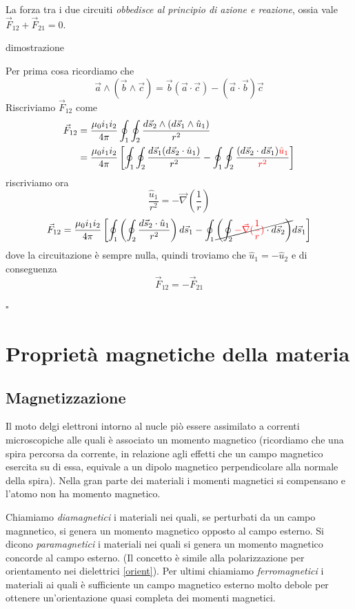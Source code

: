 \documentclass[x11names]{report}
\newcommand*{\QEDB}{\null\nobreak\hfill\ensuremath{\square}}%
\newcommand{\dimostrazione}[2]{
	\begin{dym}{dimostrazione#1}
		#2
		\QEDB
	\end{dym}
}
\begin{document}
La forza tra i due circuiti \textit{obbedisce al principio di azione e reazione}, ossia vale \(\vec{F}_{12} + \vec{F}_{21} = 0\).
\dimostrazione{}{
Per prima cosa ricordiamo che 
\[
\vec{a} \wedge (\vec{b}\wedge \vec{c}) = \vec{b}(\vec{a}\cdot \vec{c}) - (\vec{a}\cdot \vec{b})\vec{c}
\]
Riscriviamo \(\vec{F}_{12}\) come 
\begin{align*}
	\vec{F}_{12} &= \frac{\mu_0i_1i_2}{4\pi}\oint_1\oint_2\frac{d\vec{s}_2 \wedge (d\vec{s}_1\wedge\hat{u}_1)}{r^2}  \\
	&=  \frac{\mu_0i_1i_2}{4\pi}\left[\oint_1\oint_2\frac{d\vec{s}_1(d\vec{s}_2 \cdot \hat{u}_1)}{r^2} - \oint_1\oint_2\frac{(d\vec{s}_2\cdot d\vec{s}_1)\textcolor{red}{\hat{u}_1}}{\textcolor{red}{r^2}}\right]
\end{align*}
riscriviamo ora 
\[
\frac{\hat{u}_1}{r^2} = -\vec{\nabla}(\frac{1}{r})
\]
\begin{align*}
	\vec{F}_{12} = \frac{\mu_0i_1i_2}{4\pi}\left[\oint_1\left(\oint_2\frac{d\vec{s}_2 \cdot \hat{u}_1}{r^2}\right)d\vec{s}_1 - \oint_1\cancel{\left(\oint_2\textcolor{red}{-\vec{\nabla}(\frac{1}{r})}\cdot d\vec{s}_2\right)}d\vec{s}_1\right]
\end{align*}
dove la circuitazione è sempre nulla, quindi troviamo che \(\hat{u}_1 = -\hat{u}_2\) e di conseguenza
\[
\vec{F}_{12} = - \vec{F}_{21}
\]
}


\newpage
\section{Proprietà magnetiche della materia}

\subsection{Magnetizzazione}
Il moto delgi elettroni intorno al nucle piò essere assimilato a correnti microscopiche alle quali è associato un momento magnetico (ricordiamo che una spira percorsa da corrente, in relazione agli effetti che un campo magnetico esercita su di essa, equivale a un dipolo magnetico perpendicolare alla normale della spira). Nella gran parte dei materiali i momenti magnetici si compensano e l'atomo non ha momento magnetico.

Chiamiamo \textit{diamagnetici} i materiali nei quali, se perturbati da un campo magnnetico, si genera un momento magnetico opposto al campo esterno. Si dicono  \textit{paramagnetici} i materiali nei quali si genera un momento magnetico concorde al campo esterno. (Il concetto è simile alla polarizzazione per orientamento nei dielettrici \ref{orient}). Per ultimi chiamiamo \textit{ferromagnetici}  i materiali ai quali è sufficiente un campo magnetico esterno molto debole per ottenere un'orientazione quasi completa dei momenti magnetici.
\end{document}
